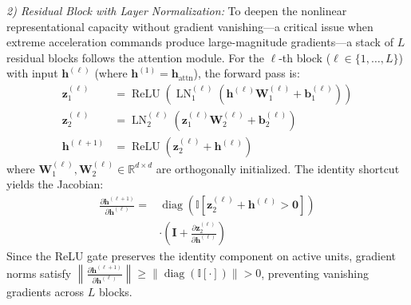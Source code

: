 \documentclass[lettersize,journal]{IEEEtran}
\newcommand{\hladd}[1]{{\color{blue}#1}}
\begin{document}
\emph{2) Residual Block with Layer Normalization:} To deepen the nonlinear representational capacity without gradient vanishing---a critical issue when \hladd{extreme acceleration commands} produce large-magnitude gradients---a stack of $L$ residual blocks follows the attention module. For the $\ell$-th block ($\ell \in \{1, \dots, L\}$) with input $\mathbf{h}^{(\ell)}$ (where $\mathbf{h}^{(1)} = \mathbf{h}_{\mathrm{attn}}$), the forward pass is:
\begin{align}
\mathbf{z}_1^{(\ell)} &= \operatorname{ReLU} \left( \operatorname{LN}_1^{(\ell)} \left( \mathbf{h}^{(\ell)}\mathbf{W}_1^{(\ell)} + \mathbf{b}_1^{(\ell)} \right) \right) \label{eq:res_block_inner1} \\
\mathbf{z}_2^{(\ell)} &= \operatorname{LN}_2^{(\ell)} \left( \mathbf{z}_1^{(\ell)}\mathbf{W}_2^{(\ell)} + \mathbf{b}_2^{(\ell)} \right) \label{eq:res_block_inner2} \\
\mathbf{h}^{(\ell+1)} &= \operatorname{ReLU} \left( \mathbf{z}_2^{(\ell)} + \mathbf{h}^{(\ell)} \right) \label{eq:res_block_out}
\end{align}
where $\mathbf{W}_1^{(\ell)}, \mathbf{W}_2^{(\ell)} \in \mathbb{R}^{d \times d}$ are orthogonally initialized. The identity shortcut yields the Jacobian:
\begin{equation}
\label{eq:jacobian}
\begin{split}
\frac{\partial \mathbf{h}^{(\ell+1)}}{\partial \mathbf{h}^{(\ell)}} =& \operatorname{diag}\!\left(\mathbb{I}\!\left[\mathbf{z}_2^{(\ell)} + \mathbf{h}^{(\ell)} > \mathbf{0}\right]\right) \\
&\cdot \left(\mathbf{I} + \frac{\partial \mathbf{z}_2^{(\ell)}}{\partial \mathbf{h}^{(\ell)}}\right)
\end{split}
\end{equation}
Since the ReLU gate preserves the identity component on active units, gradient norms satisfy $\left\|\frac{\partial \mathbf{h}^{(\ell+1)}}{\partial \mathbf{h}^{(\ell)}}\right\| \geq \left\|\operatorname{diag}(\mathbb{I}[\cdot])\right\| > 0$, preventing vanishing gradients across $L$ blocks.
\end{document}

